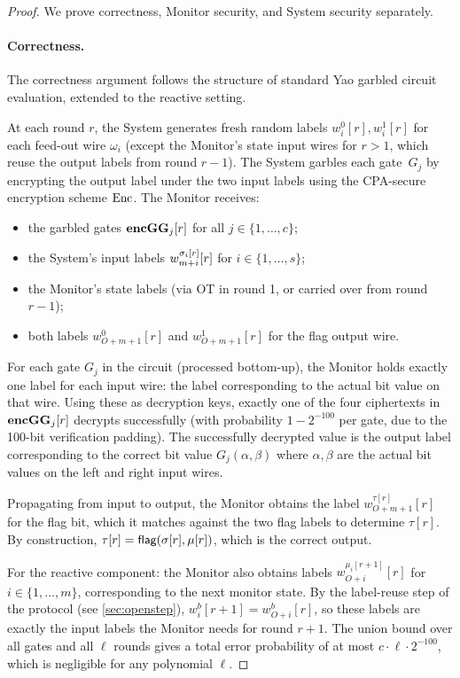 \begin{proof}
We prove correctness, Monitor security, and System security separately.

\paragraph{Correctness.}
The correctness argument follows the structure of standard Yao garbled circuit evaluation, extended to the reactive setting.

At each round $r$, the System generates fresh random labels $w_i^0[r], w_i^1[r]$ for each feed-out wire $\omega_i$ (except the Monitor's state input wires for $r > 1$, which reuse the output labels from round $r-1$). The System garbles each gate~$G_j$ by encrypting the output label under the two input labels using the CPA-secure encryption scheme $\text{Enc}$. The Monitor receives:
\begin{itemize}
    \item the garbled gates $\textbf{encGG}_j[r]$ for all $j \in \{1, \ldots, c\}$;
    \item the System's input labels $w_{m+i}^{\sigma_i[r]}[r]$ for $i \in \{1, \ldots, s\}$;
    \item the Monitor's state labels (via OT in round 1, or carried over from round $r-1$);
    \item both labels $w_{O+m+1}^0[r]$ and $w_{O+m+1}^1[r]$ for the flag output wire.
\end{itemize}

For each gate $G_j$ in the circuit (processed bottom-up), the Monitor holds exactly one label for each input wire: the label corresponding to the actual bit value on that wire. Using these as decryption keys, exactly one of the four ciphertexts in $\textbf{encGG}_j[r]$ decrypts successfully (with probability $1 - 2^{-100}$ per gate, due to the 100-bit verification padding). The successfully decrypted value is the output label corresponding to the correct bit value $G_j(\alpha, \beta)$ where $\alpha, \beta$ are the actual bit values on the left and right input wires.

Propagating from input to output, the Monitor obtains the label $w_{O+m+1}^{\tau[r]}[r]$ for the flag bit, which it matches against the two flag labels to determine $\tau[r]$. By construction, $\tau[r] = \textsf{flag}(\sigma[r], \mu[r])$, which is the correct output.

For the reactive component: the Monitor also obtains labels $w_{O+i}^{\mu_i[r+1]}[r]$ for $i \in \{1, \ldots, m\}$, corresponding to the next monitor state. By the label-reuse step of the protocol (see \cref{sec:openstep}), $w_i^b[r+1] = w_{O+i}^b[r]$, so these labels are exactly the input labels the Monitor needs for round $r+1$. The union bound over all gates and all $\ell$ rounds gives a total error probability of at most $c \cdot \ell \cdot 2^{-100}$, which is negligible for any polynomial $\ell$.


\end{proof}
